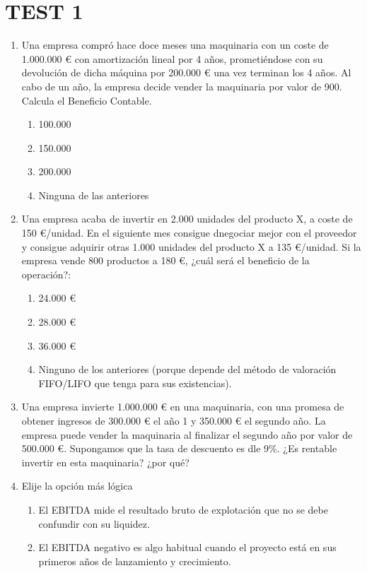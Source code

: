 \chapter*{TEST 1}
\begin{enumerate}
    \item Una empresa compró hace doce meses una maquinaria con un coste de 1.000.000 € con amortización lineal por 4 años, prometiéndose con su devolución de dicha máquina por 200.000 € una vez terminan los 4 años. Al cabo de un año, la empresa decide vender la maquinaria por valor de 900. Calcula el Beneficio Contable.
    \begin{enumerate}
        \item 100.000
        \item 150.000
        \item 200.000
        \item Ninguna de las anteriores
    \end{enumerate}
    \item Una empresa acaba de invertir en 2.000 unidades del producto X, a coste de 150 €/unidad. En el siguiente mes consigue dnegociar mejor con el proveedor y consigue adquirir otras 1.000 unidades del producto X a 135 €/unidad. Si la empresa vende 800 productos a 180 €, ¿cuál será el beneficio de la operación?:
    \begin{enumerate}
        \item 24.000 €
        \item 28.000 €
        \item 36.000 €
        \item Ninguno de los anteriores (porque depende del método de valoración FIFO/LIFO que tenga para sus existencias).
    \end{enumerate}
    \item Una empresa invierte 1.000.000 € en una maquinaria, con una promesa de obtener ingresos de 300.000 € el año 1 y 350.000 € el segundo año. La empresa puede vender la maquinaria al finalizar el segundo año por valor de 500.000 €. Supongamos que la tasa de descuento es dle 9\%. ¿Es rentable invertir en esta maquinaria? ¿por qué?
    \item Elije la opción más lógica
    \begin{enumerate}
        \item El EBITDA mide el resultado bruto de explotación que no se debe confundir con su liquidez.
        \item El EBITDA negativo es algo habitual cuando el proyecto está en sus primeros años de lanzamiento y crecimiento.

\end{enumerate}
\end{enumerate}
